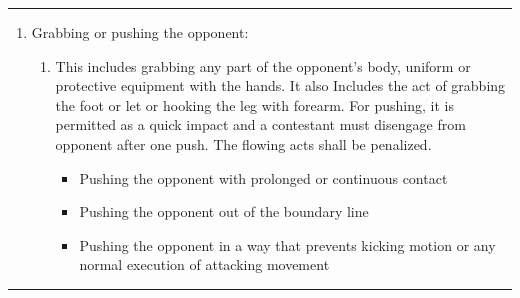 \documentclass[]{report}
\providecommand{\tightlist}{%
  \setlength{\itemsep}{0pt}\setlength{\parskip}{0pt}}
\renewcommand{\labelenumii}{\arabic{enumi}.\arabic{enumii}}
\newenvironment{expl}[0]%
  {\rule{\textwidth}{.2pt}\footnotesize}%
  {\rule{\textwidth}{.2pt}\normalsize}
\begin{document}
\begin{expl}
\begin{enumerate}
\begin{enumerate}
\def\labelenumii{\alph{enumii})}
\item
  This act involves stalling with no intention of attacking. A
  contestant who continuously displays a non-engaging style shall be
  given a ``Gam-jeom''. If both contestants remain inactive after three
  (3) seconds, the center referee will signal the ``\,``Gong-gyeok''
  command. A ``Gam-jeom'' will be declared: On both contestants if there
  is no activity from them three (3) seconds after the command was
  given; or on the contestant who moved backwards from the original
  position three (3) seconds after the command was given.
\item
  Turning the back and move away to avoid the opponent's attack should
  be punished as it expresses the lack of a spirit of fair play and may
  cause serious injury. The same penalty should also be given for
  evading the opponent's attack by bending below waist level or
  crouching.
\item
  Retreating from the technical engagement only to avoid the opponent's
  attack and to run out the clock, ``Gam-jeom'' shall be given to the
  passive contestant.
\item
  Pretending injury means exaggerating injury or indicating pain in a
  body part not subjected to a blow for the purpose of demonstrating the
  opponent's actions as a violation, and also exaggerating pain for the
  purpose of elapsing the match time.
\item
  ``Gam-jeom'' shall also be given to the athlete who asks the referee
  to stop the contest in order to adjust the position/fit of protective
  equipment.
\end{enumerate}

\item
  Grabbing or pushing the opponent:

\begin{enumerate}
\def\labelenumii{\alph{enumii})}
\item
  This includes grabbing any part of the opponent's body, uniform or
  protective equipment with the hands. It also Includes the act of
  grabbing the foot or let or hooking the leg with forearm. For pushing,
  it is permitted as a quick impact and a contestant must disengage from
  opponent after one push. The flowing acts shall be penalized.

    \begin{itemize}
    \tightlist
    \item
      Pushing the opponent with prolonged or continuous contact
    \item
      Pushing the opponent out of the boundary line
    \item
      Pushing the opponent in a way that prevents kicking motion or any
      normal execution of attacking movement
    \end{itemize}


\end{enumerate}
\end{enumerate}
\end{expl}
\end{document}

